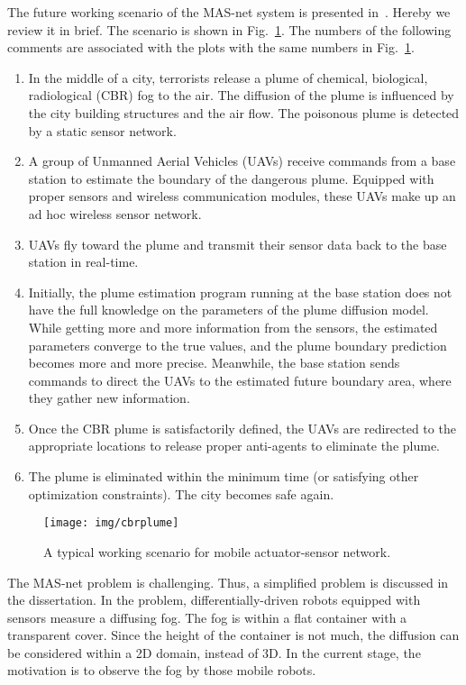 The future working scenario of the MAS-net system is presented in~\cite{Moorewhitepaper03,MooreChen04}. Hereby we review it in brief. The scenario is shown in Fig.~\ref{f:app}. The numbers of the following comments are associated with the plots with the same numbers in Fig.~\ref{f:app}.
\begin{enumerate}
\item In the middle of a city, terrorists release a plume of chemical, biological, radiological (CBR) fog to the air. The diffusion of the plume is influenced by the
city building structures and the air flow. The poisonous plume is detected by a static sensor network.
\item  A group of Unmanned Aerial Vehicles (UAVs) receive commands from a base station to estimate the boundary of the
dangerous plume. Equipped with proper sensors and wireless communication modules, these UAVs make up an ad hoc
wireless sensor network.
\item  UAVs fly toward the plume and transmit their sensor data back to the base station in real-time.
\item  Initially, the plume estimation program running at the base station does not have the full knowledge on the parameters of the plume
diffusion model. While getting more and more information from the sensors, the estimated parameters converge to the
true values, and the plume boundary prediction becomes more and more precise. Meanwhile, the base station sends
commands to direct the UAVs to the estimated future boundary area, where they gather new information.
\item  Once the CBR plume is satisfactorily defined, the UAVs are redirected to the appropriate locations to release proper
anti-agents to eliminate the plume.
\item  The plume is eliminated within the minimum time (or satisfying other optimization constraints). The city becomes safe again.
\end{enumerate}

\begin{figure}[!h]
\begin{center}\texttt{[image: img/cbrplume]}
  \end{center}
\caption{A typical working scenario for mobile actuator-sensor network.\label{f:app}}
\end{figure}


The MAS-net problem is challenging. Thus, a simplified problem is discussed in the dissertation. In the problem, differentially-driven robots equipped with sensors measure a diffusing fog. The fog is within a flat container with a transparent cover. Since the height of the container is not much, the diffusion can be considered within a 2D domain, instead of 3D. In the current stage, the motivation is to observe the fog by those mobile robots.

